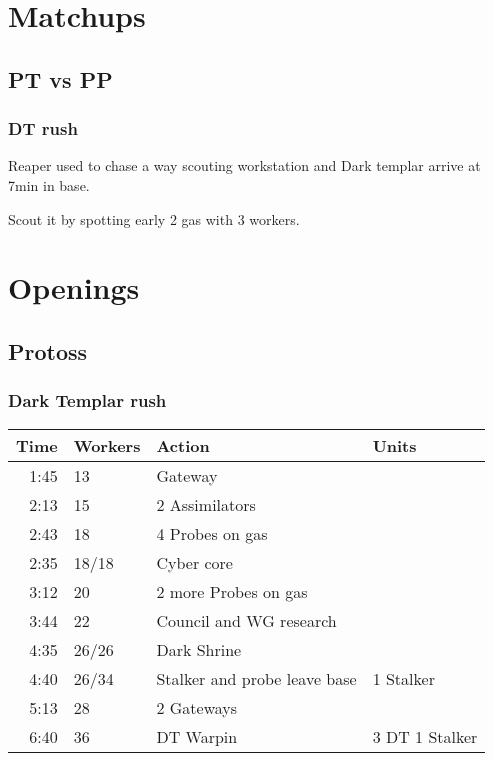 \documentclass{report}
\newcommand{\action}[4]{#1 & #2 & #3 & #4 \\ \hline}
\newenvironment{opening}
{
    \begin{tabular}{|r|l|l|l|}
    \hline
    \textbf{Time} & \textbf{Workers} & \textbf{Action} & \textbf{Units} \\
    \hline
}
{
    \end{tabular}
}
\begin{document}
\tableofcontents\newpage
\chapter{Matchups}
\section{PT vs PP}
\subsection{DT rush}
Reaper used to chase a way scouting workstation and Dark
templar arrive at 7min in base.

Scout it by spotting early 2 gas with 3 workers.


\chapter{Openings}
\section{Protoss}
\subsection{Dark Templar rush}

\begin{opening}
\action{1:45}{13}   {Gateway}                     {}
\action{2:13}{15}   {2 Assimilators}              {}
\action{2:43}{18}   {4 Probes on gas}             {}
\action{2:35}{18/18}{Cyber core}                  {}
\action{3:12}{20}   {2 more Probes on gas}        {}
\action{3:44}{22}   {Council and WG research}     {}
\action{4:35}{26/26}{Dark Shrine}                 {}
\action{4:40}{26/34}{Stalker and probe leave base}{1 Stalker}
\action{5:13}{28}   {2 Gateways}                  {}
\action{6:40}{36}   {DT Warpin}                   {3 DT 1 Stalker}
\end{opening}
\end{document}
